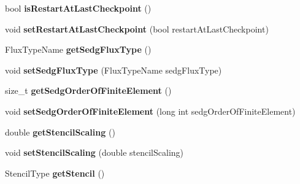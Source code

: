 \begin{DoxyCompactItemize}
\item 
\hypertarget{classnatrium_1_1SolverConfiguration_a6ca256e404b94f7201ecace9307ef1df}{
bool {\bfseries isRestartAtLastCheckpoint} ()}
\label{classnatrium_1_1SolverConfiguration_a6ca256e404b94f7201ecace9307ef1df}

\item 
\hypertarget{classnatrium_1_1SolverConfiguration_af6077ef11412e53eb16c013b4362410e}{
void {\bfseries setRestartAtLastCheckpoint} (bool restartAtLastCheckpoint)}
\label{classnatrium_1_1SolverConfiguration_af6077ef11412e53eb16c013b4362410e}

\item 
\hypertarget{classnatrium_1_1SolverConfiguration_aecc2a87bc6e50d6e09ea035678478c4f}{
FluxTypeName {\bfseries getSedgFluxType} ()}
\label{classnatrium_1_1SolverConfiguration_aecc2a87bc6e50d6e09ea035678478c4f}

\item 
\hypertarget{classnatrium_1_1SolverConfiguration_a331256f91794e32be618b1162c321bdd}{
void {\bfseries setSedgFluxType} (FluxTypeName sedgFluxType)}
\label{classnatrium_1_1SolverConfiguration_a331256f91794e32be618b1162c321bdd}

\item 
\hypertarget{classnatrium_1_1SolverConfiguration_a1fad5bbbc062b1aad018da73e90033b2}{
size\_\-t {\bfseries getSedgOrderOfFiniteElement} ()}
\label{classnatrium_1_1SolverConfiguration_a1fad5bbbc062b1aad018da73e90033b2}

\item 
\hypertarget{classnatrium_1_1SolverConfiguration_a2a9ab8b6b6dcb47ad4bb85ef06e15dea}{
void {\bfseries setSedgOrderOfFiniteElement} (long int sedgOrderOfFiniteElement)}
\label{classnatrium_1_1SolverConfiguration_a2a9ab8b6b6dcb47ad4bb85ef06e15dea}

\item 
\hypertarget{classnatrium_1_1SolverConfiguration_adb7b45c43f97f0ce2ca288f92a32b577}{
double {\bfseries getStencilScaling} ()}
\label{classnatrium_1_1SolverConfiguration_adb7b45c43f97f0ce2ca288f92a32b577}

\item 
\hypertarget{classnatrium_1_1SolverConfiguration_a1dff19c0a3cc7386bd629dd72e59ac42}{
void {\bfseries setStencilScaling} (double stencilScaling)}
\label{classnatrium_1_1SolverConfiguration_a1dff19c0a3cc7386bd629dd72e59ac42}

\item 
\hypertarget{classnatrium_1_1SolverConfiguration_a962af94c9599c393d8a16d7f5ae04d6c}{
StencilType {\bfseries getStencil} ()}
\label{classnatrium_1_1SolverConfiguration_a962af94c9599c393d8a16d7f5ae04d6c}


\end{DoxyCompactItemize}
